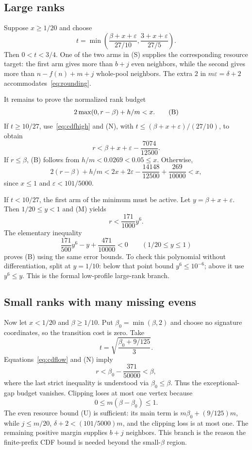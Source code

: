 \subsection{Large ranks}
Suppose $x\ge1/20$ and choose
\[
 t=\min\left(\frac{\beta+x+\varepsilon}{27/10},
              \frac{3+x+\varepsilon}{27/5}\right).
\]
Then $0<t<3/4$. One of the two arms in (S) supplies the corresponding resource target: the first arm gives more than $b+j$ even neighbors, while the second gives more than $n-f(n)+m+j$ whole-pool neighbors. The extra $2$ in $m\varepsilon=\delta+2$ accommodates~\eqref{eq:rounding}.

It remains to prove the normalized rank budget
\[
 2\max(0,r-\beta)+h/m<x.\label{eq:budget}\tag{B}
\]
If $t\ge10/27$, use~\eqref{eq:cdfhigh} and (N), with $t\le(\beta+x+\varepsilon)/(27/10)$, to obtain
\[
 r<\beta+x+\varepsilon-\frac{7074}{12500}.
\]
If $r\le\beta$, (B) follows from $h/m<0.0269<0.05\le x$. Otherwise,
\[
 2(r-\beta)+h/m
 <2x+2\varepsilon-\frac{14148}{12500}+\frac{269}{10000}<x,
\]
since $x\le1$ and $\varepsilon<101/5000$.

If $t<10/27$, the first arm of the minimum must be active. Let $y=\beta+x+\varepsilon$. Then $1/20\le y<1$ and (M) yields
\[
 r<\frac{171}{1000}y^6.
\]
The elementary inequality
\[
 \frac{171}{500}y^6-y+\frac{471}{10000}<0
 \qquad(1/20\le y\le1)
\]
proves (B) using the same error bounds. To check this polynomial without differentiation, split at $y=1/10$: below that point bound $y^6\le10^{-6}$; above it use $y^6\le y$. This is the formal low-profile large-rank branch.

\subsection{Small ranks with many missing evens}
Now let $x<1/20$ and $\beta\ge1/10$. Put $\beta_0=\min(\beta,2)$ and choose no signature coordinates, so the transition cost is zero. Take
\[
 t=\sqrt{\frac{\beta_0+9/125}{3}}.
\]
Equations~\eqref{eq:cdflow} and (N) imply
\[
 r<\beta_0-\frac{371}{50000}<\beta,
\]
where the last strict inequality is understood via $\beta_0\le\beta$. Thus the exceptional-gap budget vanishes. Clipping loses at most one vertex because
\[
 0\le m(\beta-\beta_0)\le1.
\]
The even resource bound (U) is sufficient: its main term is $m\beta_0+(9/125)m$, while $j\le m/20$, $\delta+2<(101/5000)m$, and the clipping loss is at most one. The remaining positive margin supplies $b+j$ neighbors. This branch is the reason the finite-prefix CDF bound is needed beyond the small-$\beta$ region.

